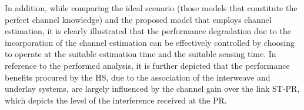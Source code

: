 In addition, while comparing the ideal scenario (those models that constitute the perfect channel knowledge) and the proposed model that employs channel estimation, it is clearly illustrated that the performance degradation due to the incorporation of the channel estimation can be effectively controlled by choosing to operate at the suitable estimation time and the suitable sensing time. 
In reference to the performed analysis, it is further depicted that the performance benefits procured by the HS, due to the association of the interweave and underlay systems, are largely influenced by the channel gain over the link ST-PR, which depicts the level of the interference received at the PR. 


